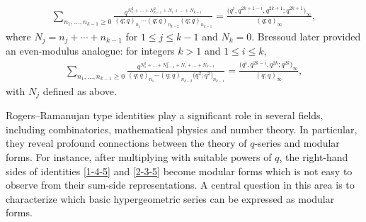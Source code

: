 \documentclass[10pt,a4paper]{amsart}
\numberwithin{equation}{section}
\theoremstyle{definition}
\begin{document}
\begin{align}\label{a-g-identity}
\sum_{n_1, \dots, n_{k-1} \geq 0} \frac{q^{N_1^2 + \dots + N_{k-1}^2 + N_i + \dots + N_{k-1}}}{(q; q)_{n_1} \cdots (q; q)_{n_{k-2}} (q; q)_{n_{k-1}}} = \frac{\bigl(q^i, q^{2k + 1 - i}, q^{2k + 1}; q^{2k + 1}\bigr)_{\infty}}{(q; q)_{\infty}},
\end{align}
where $N_j=n_j+\cdots+n_{k-1}$ for $1\leq j\leq k-1$ and $N_k=0$. Bressoud \cite{Bressoud-1980} later provided an even-modulus analogue: for integers $k>1$ and $1\leq i\leq k$,
\begin{align}\label{b-identity}
\sum_{n_1, \dots, n_{k-1} \geq 0} \frac{q^{N_1^2 + \dots + N_{k-1}^2 + N_i + \dots + N_{k-1}}}{(q; q)_{n_1} \cdots (q; q)_{n_{k-2}} \bigl(q^2; q^2\bigr)_{n_{k-1}}} = \frac{\bigl(q^i, q^{2k - i}, q^{2k }; q^{2k}\bigr)_{\infty}}{(q; q)_{\infty}},
\end{align}
with $N_j$ defined as above.\par
Rogers--Ramanujan type identities play a significant role in several fields, including combinatorics, mathematical physics and number theory. In particular, they reveal profound connections between the theory of $q$-series and modular forms. For instance, after multiplying with suitable powers of $q$, the right-hand sides of identities \eqref{1-4-5} and \eqref{2-3-5} become modular forms which is not easy to observe from their sum-side representations. A central question in this area is to characterize which basic hypergeometric series can be expressed as modular forms.
\end{document}
